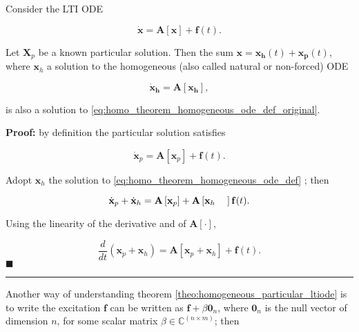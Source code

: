 \begin{theorem}\label{theo:homogeneous_particular_ltiode} %

	Consider the LTI ODE 

\begin{equation} \dot{\mathbf{x}} = \mathbf{A}\left[\mathbf{x}\right] + \mathbf{f}(t) . \label{eq:homo_theorem_homogeneous_ode_def_original}\end{equation}

	Let $\mathbf{X}_p$ be a known particular solution. Then the sum $\mathbf{x} = \mathbf{x_h} (t) + \mathbf{x_p}(t)$, where $\mathbf{x}_h$ a solution to the homogeneous (also called natural or non-forced) ODE

\begin{equation} \dot{\mathbf{x}}_\mathbf{h} = \mathbf{A}\left[\mathbf{x_h}\right] \label{eq:homo_theorem_homogeneous_ode_def},\end{equation}

	\noindent is also a solution to \eqref{eq:homo_theorem_homogeneous_ode_def_original}.

\end{theorem}
\noindent\textbf{Proof:} by definition the particular solution satisfies

\begin{equation} \dot{\mathbf{x}}_p = \mathbf{A}\left[\mathbf{x}_p\right] + \mathbf{f}(t) .\end{equation}

	Adopt $\mathbf{x}_h$ the solution to \eqref{eq:homo_theorem_homogeneous_ode_def} ; then

\begin{equation} \dot{\mathbf{x}}_p + \dot{\mathbf{x}}_h = \mathbf{A}\left[\mathbf{x}_p\right] + \mathbf{A}\left[\mathbf{x}_h\hphantom{x_P}\right] \mathbf{f}(t) .\end{equation}

	Using the linearity of the derivative and of $\mathbf{A}\left[\cdot\right]$,

\begin{equation} \dfrac{d}{dt} \left(\mathbf{x}_p + \mathbf{x}_h\right) = \mathbf{A}\left[\mathbf{x}_p + \mathbf{x}_h\right] + \mathbf{f}(t) .\end{equation}
\hfill$\blacksquare$
\vspace{5mm}
\hrule
\vspace{5mm} %

	Another way of understanding theorem \ref{theo:homogeneous_particular_ltiode} is to write the excitation $\mathbf{f}$ can be written as $\mathbf{f} + \beta\mathbf{0}_n$, where $\mathbf{0}_n$ is the null vector of dimension $n$, for some scalar matrix $\beta\in\mathbb{C}^{\left(n\times m\right)}$; then

